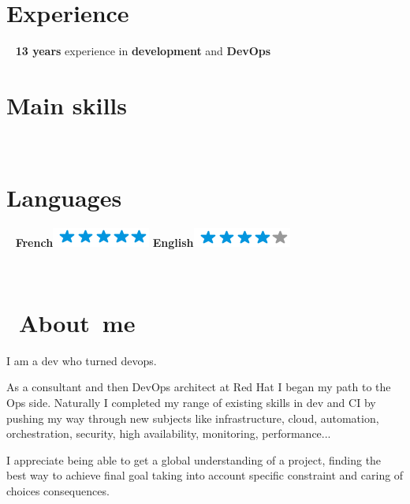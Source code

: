 \documentclass[]{friggeri-cv}
\begin{document}
\begin{aside}
    \section{Experience}
    ~
    	\textbf{13 years} experience in 	\textbf{development} and 	\textbf{DevOps}
    	~
    \section{Main skills}
    ~
    ~
    ~
    \section{Languages}
    ~
    \textbf{French}\includegraphics[scale=0.40]{img/5stars.png}\vspace{4pt}
    \textbf{English}\includegraphics[scale=0.40]{img/4stars.png}
    ~    
\end{aside}
~
\newlength{\parsepsave}
\section{\ About\ me} 
 \qquad I am a dev who turned devops. 
 
 \vspace{-4pt}
 \qquad  As a consultant and then DevOps architect at Red Hat I began my path to the Ops side. Naturally I completed my range of existing skills in dev and CI by pushing my way through new subjects like infrastructure, cloud, automation, orchestration, security, high availability, monitoring, performance...
 
 \vspace{-4pt}
 \qquad   I appreciate being able to get a global understanding of a project, finding the best way to achieve final goal taking into account specific constraint and caring of choices consequences. 
 
\end{document}
